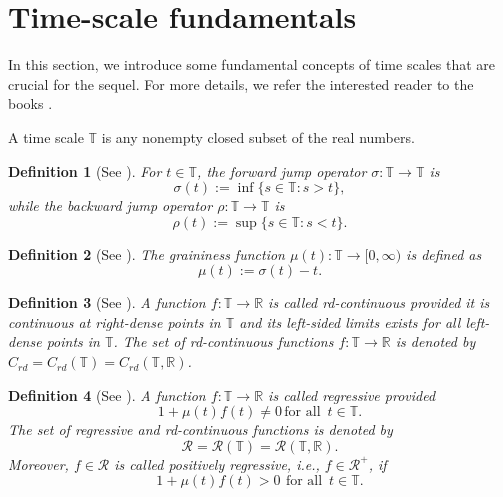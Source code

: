\documentclass[pdflatex,sn-mathphys-num]{sn-jnl}
\newtheorem{definition}{Definition}
\theoremstyle{remark}
\begin{document}

\section{Time-scale fundamentals}
\label{sec2}

In this section, we introduce some fundamental concepts of time scales 
that are crucial for the sequel. For more details,
we refer the interested reader to the books 
\cite{book:ts, advanced:book:ts}.

A time scale $\mathbb{T}$ is any nonempty closed subset of the real numbers.

\begin{definition}[See \cite{book:ts}]
For $t \in \mathbb{T}$, the forward jump operator $\sigma : \mathbb{T} 
\rightarrow \mathbb{T}$ is
$$\sigma(t) := \inf\{s \in \mathbb{T} : s > t\},$$
while the backward jump operator $\rho : \mathbb{T} \rightarrow \mathbb{T}$
is $$\rho(t) := \sup\{s \in \mathbb{T} : s < t\}.$$
\end{definition}  

\begin{definition}[See \cite{book:ts}]
The graininess function $\mu(t): \mathbb{T} \rightarrow [0, \infty)$ is 
defined as
$$\mu(t) := \sigma(t) - t.$$ 
\end{definition}

\begin{definition}[See \cite{book:ts}]
A function $f: \mathbb{T} \rightarrow \mathbb{R}$ is called rd-continuous 
provided it is continuous at right-dense points in $\mathbb{T}$ and its 
left-sided limits exists for all left-dense points in $\mathbb{T}$. The set 
of rd-continuous functions $f: \mathbb{T} \rightarrow \mathbb{R}$ is denoted 
by $C_{rd} = C_{rd}(\mathbb{T}) = C_{rd}(\mathbb{T},\mathbb{R})$. 
\end{definition}

\begin{definition}[See \cite{book:ts}]
A function $f: \mathbb{T} \rightarrow \mathbb{R}$ is called regressive provided
$$1 + \mu(t)f(t) \neq 0\, \text{for all}\,\,\, t \in \mathbb{T}.$$
The set of regressive and rd-continuous functions is denoted by 
$$\mathcal{R} = \mathcal{R}(\mathbb{T}) = \mathcal{R}(\mathbb{T}, \mathbb{R}).$$
Moreover, $f \in \mathcal{R}$ is called positively regressive,
i.e., $f \in \mathcal{R}^+$, if 
$$1 + \mu(t)f(t) > 0\, \ \text{for all}\,\,\, t \in \mathbb{T}.$$ 
\end{definition}
\end{document}

